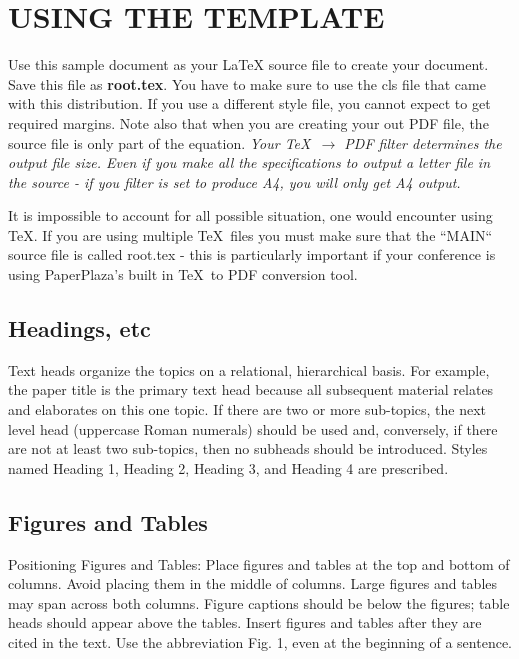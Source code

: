 \documentclass[letterpaper, 10pt, conference]{ieeeconf}   %
\begin{document}
\begin{CJK*}{UTF8}{bsmi}
\begin{itemize}
\end{itemize}


\section{USING THE TEMPLATE}

Use this sample document as your LaTeX source file to create your document. Save this file as {\bf root.tex}. You have to make sure to use the cls file that came with this distribution. If you use a different style file, you cannot expect to get required margins. Note also that when you are creating your out PDF file, the source file is only part of the equation. {\it Your \TeX\ $\rightarrow$ PDF filter determines the output file size. Even if you make all the specifications to output a letter file in the source - if you filter is set to produce A4, you will only get A4 output. }

It is impossible to account for all possible situation, one would encounter using \TeX. If you are using multiple \TeX\ files you must make sure that the ``MAIN`` source file is called root.tex - this is particularly important if your conference is using PaperPlaza's built in \TeX\ to PDF conversion tool.

\subsection{Headings, etc}

Text heads organize the topics on a relational, hierarchical basis. For example, the paper title is the primary text head because all subsequent material relates and elaborates on this one topic. If there are two or more sub-topics, the next level head (uppercase Roman numerals) should be used and, conversely, if there are not at least two sub-topics, then no subheads should be introduced. Styles named Heading 1, Heading 2, Heading 3, and Heading 4 are prescribed.

\subsection{Figures and Tables}

Positioning Figures and Tables: Place figures and tables at the top and bottom of columns. Avoid placing them in the middle of columns. Large figures and tables may span across both columns. Figure captions should be below the figures; table heads should appear above the tables. Insert figures and tables after they are cited in the text. Use the abbreviation Fig. 1, even at the beginning of a sentence.


\end{CJK*}
\end{document}
